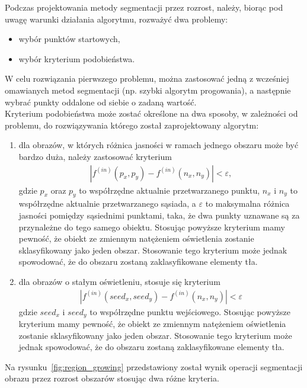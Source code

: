 Podczas projektowania metody segmentacji przez rozrost, należy, biorąc pod uwagę warunki działania algorytmu, rozważyć dwa problemy:
\begin{itemize}
  \item wybór punktów startowych,
  \item wybór kryterium podobieństwa.
\end{itemize}
W celu rozwiązania pierwszego problemu, można zastosować jedną z wcześniej omawianych metod segmentacji (np. szybki algorytm progowania), a następnie wybrać punkty oddalone od siebie o zadaną wartość. \\
Kryterium podobieństwa może zostać określone na dwa sposoby, w zależności od problemu, do rozwiązywania którego został zaprojektowany algorytm:
\begin{enumerate}
  \item dla obrazów, w których różnica jasności w ramach jednego obszaru może być bardzo duża, należy zastosować kryterium 
    \begin{gather*}
      |f^{(in)}(p_x, p_y) - f^{(in)}(n_x, n_y)| < \varepsilon,
    \end{gather*}
    gdzie $p_x$ oraz $p_y$ to współrzędne aktualnie przetwarzanego punktu, $n_x$ i $n_y$ to współrzędne aktualnie przetwarzanego sąsiada, a $\varepsilon$ to maksymalna różnica jasności pomiędzy sąsiednimi punktami, taka, że dwa punkty uznawane są za przynależne do tego samego obiektu. Stosując powyższe kryterium mamy pewność, że obiekt ze zmiennym natężeniem oświetlenia zostanie sklasyfikowany jako jeden obszar. Stosowanie tego kryterium może jednak spowodować, że do obszaru zostaną zaklasyfikowane elementy tła.
    \item dla obrazów o stałym oświetleniu, stosuje się kryterium
      \begin{gather*}
        |f^{(in)}(seed_x, seed_y) - f^{(in)}(n_x, n_y)| < \varepsilon
      \end{gather*}
      gdzie $seed_x$ i $seed_y$ to współrzędne punktu wejściowego. Stosując powyższe kryterium mamy pewność, że obiekt ze zmiennym natężeniem oświetlenia zostanie sklasyfikowany jako jeden obszar. Stosowanie tego kryterium może jednak spowodować, że do obszaru zostaną zaklasyfikowane elementy tła.
\end{enumerate}
Na rysunku~\ref{fig:region_growing} przedstawiony został wynik operacji segmentacji obrazu przez rozrost obszarów stosując dwa różne kryteria.
